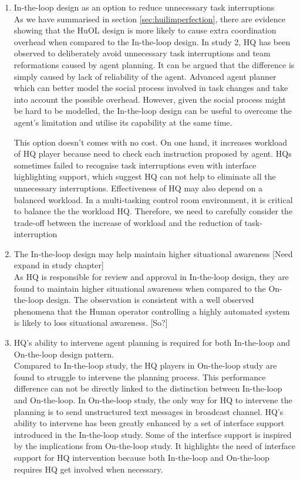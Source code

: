 \begin{enumerate}
\item In-the-loop design as an option to reduce unnecessary task interruptions \\
As we have summarised in section \ref{sec:huilimperfection}, there are evidence showing that the HuOL design is more likely to cause extra coordination overhead when compared to the In-the-loop design. In study 2, HQ has been observed to deliberately avoid unnecessary task interruptions and team reformations caused by agent planning. It can be argued that the difference is simply caused by lack of reliability of the agent. Advanced agent planner which can better model the social process involved in task changes and take into account the possible overhead. However, given the social process might be hard to be modelled, the In-the-loop design can be useful to overcome the agent's limitation and utilise its capability at the same time.  

This option doesn't comes with no cost. On one hand, it increases workload of HQ player because need to check each instruction proposed by agent. HQs sometimes failed to recognise task interruptions even with interface highlighting support, which suggest HQ can not help to eliminate all the unnecessary interruptions. Effectiveness of HQ may also depend on a balanced workload. In a multi-tasking control room environment, it is critical to balance the the workload HQ. Therefore, we need to carefully consider the trade-off between the increase of workload and the reduction of task-interruption \\


\item The In-the-loop design may help maintain higher situational awareness [Need expand in study chapter]\\
As HQ is responsible for review and approval in In-the-loop design, they are found to maintain higher situational awareness when compared to the On-the-loop design. The observation is consistent with a well observed phenomena that the Human operator controlling a highly automated system is likely to loss situational awareness. [So?] \\

\item HQ's ability to intervene agent planning is required for both In-the-loop and On-the-loop design pattern.\\
Compared to In-the-loop study, the HQ players in On-the-loop study are found to struggle to intervene the planning process. This performance difference can not be directly linked to the distinction between In-the-loop and On-the-loop. In On-the-loop study, the only way for HQ to intervene the planning is to send unstructured text messages in broadcast channel. HQ's ability to intervene has been greatly enhanced by a set of interface support introduced in the In-the-loop study. Some of the interface support is inspired by the implications from On-the-loop study. It highlights the need of interface support for HQ intervention because both In-the-loop and On-the-loop requires HQ get involved when necessary. \\


\end{enumerate}
